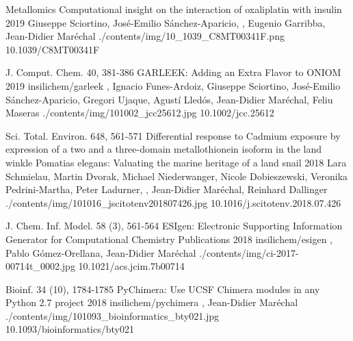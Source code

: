 \begin{cventries}
  \pubentry
    {Metallomics} %
    {Computational insight on the interaction of oxaliplatin with insulin} %
    {2019} %
    {} %
    {Giuseppe Sciortino, José-Emilio Sánchez-Aparicio, , Eugenio Garribba, Jean-Didier Maréchal} %
    {./contents/img/10_1039_C8MT00341F.png} %
    {10.1039/C8MT00341F} %

  \pubentry
    {J. Comput. Chem. 40, 381-386} %
    {GARLEEK: Adding an Extra Flavor to ONIOM} %
    {2019} %
    {insilichem/garleek} %
    {, Ignacio Funes-Ardoiz, Giuseppe Sciortino, José-Emilio Sánchez-Aparicio, Gregori Ujaque, Agustí Lledós, Jean-Didier Maréchal, Feliu Maseras} %
    {./contents/img/101002_jcc25612.jpg} %
    {10.1002/jcc.25612} %

  \pubentry
    {Sci. Total. Environ. 648, 561-571} %
    {Differential response to Cadmium exposure by expression of a two and a three-domain metallothionein isoform in the land winkle Pomatias elegans: Valuating the marine heritage of a land snail} %
    {2018} %
    {} %
    {Lara Schmielau, Martin Dvorak, Michael Niederwanger, Nicole Dobieszewski, Veronika Pedrini-Martha, Peter Ladurner, , Jean-Didier Maréchal, Reinhard Dallinger} %
    {./contents/img/101016_jscitotenv201807426.jpg} %
    {10.1016/j.scitotenv.2018.07.426} %

  \pubentry
    {J. Chem. Inf. Model. 58 (3), 561-564} %
    {ESIgen: Electronic Supporting Information Generator for Computational Chemistry Publications} %
    {2018} %
    {insilichem/esigen} %
    {,\textsuperscript{\dagger} Pablo Gómez-Orellana, Jean-Didier Maréchal\textsuperscript{\dagger}} %
    {./contents/img/ci-2017-00714t_0002.jpg} %
    {10.1021/acs.jcim.7b00714} %

  \pubentry
    {Bioinf. 34 (10), 1784-1785} %
    {PyChimera: Use UCSF Chimera modules in any Python 2.7 project} %
    {2018} %
    {insilichem/pychimera} %
    {,\textsuperscript{\dagger} Jean-Didier Maréchal\textsuperscript{\dagger}} %
    {./contents/img/101093_bioinformatics_bty021.jpg} %
    {10.1093/bioinformatics/bty021} %


\end{cventries}
